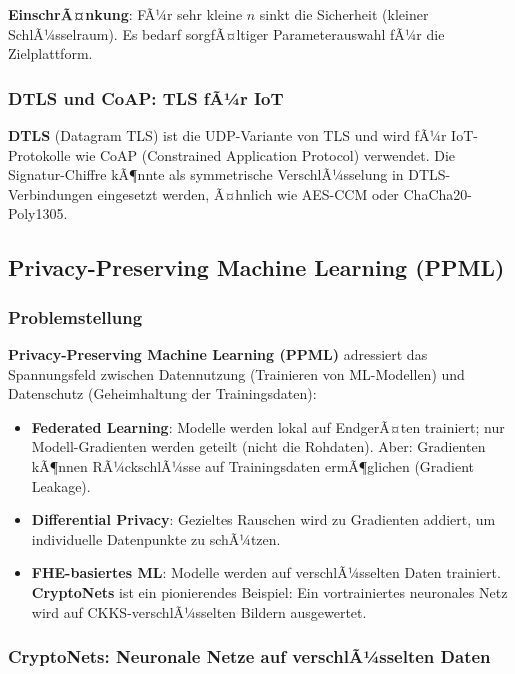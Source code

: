 ﻿\documentclass[a4paper,12pt]{scrreprt}
\theoremstyle{definition}
\begin{document}
\textbf{EinschrÃ¤nkung}: FÃ¼r sehr kleine $n$ sinkt die Sicherheit (kleiner SchlÃ¼sselraum). Es bedarf sorgfÃ¤ltiger Parameterauswahl fÃ¼r die Zielplattform.

\subsubsection{DTLS und CoAP: TLS fÃ¼r IoT}

\textbf{DTLS} (Datagram TLS) ist die UDP-Variante von TLS und wird fÃ¼r IoT-Protokolle wie CoAP (Constrained Application Protocol) verwendet. Die Signatur-Chiffre kÃ¶nnte als symmetrische VerschlÃ¼sselung in DTLS-Verbindungen eingesetzt werden, Ã¤hnlich wie AES-CCM oder ChaCha20-Poly1305.

\subsection{Privacy-Preserving Machine Learning (PPML)}

\subsubsection{Problemstellung}

\textbf{Privacy-Preserving Machine Learning (PPML)} adressiert das Spannungsfeld zwischen Datennutzung (Trainieren von ML-Modellen) und Datenschutz (Geheimhaltung der Trainingsdaten):

\begin{itemize}
    \item \textbf{Federated Learning}: Modelle werden lokal auf EndgerÃ¤ten trainiert; nur Modell-Gradienten werden geteilt (nicht die Rohdaten). Aber: Gradienten kÃ¶nnen RÃ¼ckschlÃ¼sse auf Trainingsdaten ermÃ¶glichen (Gradient Leakage).
    \item \textbf{Differential Privacy}: Gezieltes Rauschen wird zu Gradienten addiert, um individuelle Datenpunkte zu schÃ¼tzen.
    \item \textbf{FHE-basiertes ML}: Modelle werden auf verschlÃ¼sselten Daten trainiert. \textbf{CryptoNets} \cite{GLP+21} ist ein pionierendes Beispiel: Ein vortrainiertes neuronales Netz wird auf CKKS-verschlÃ¼sselten Bildern ausgewertet.
\end{itemize}

\subsubsection{CryptoNets: Neuronale Netze auf verschlÃ¼sselten Daten}
\end{document}
